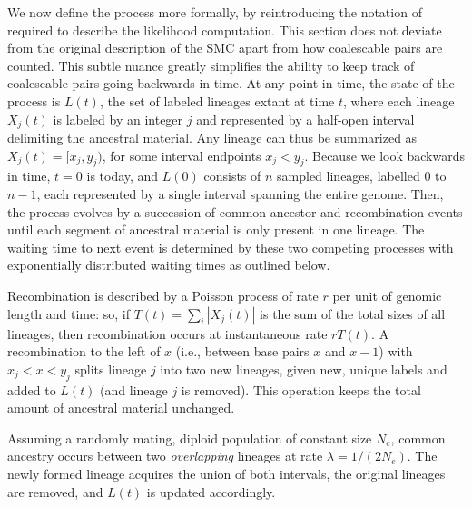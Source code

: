 \documentclass{article}
\begin{document}
We now define the process more formally, by reintroducing
the notation of \citet{mcvean_approximating_2005} required to describe
the likelihood computation. This section
does not deviate from the original description of the SMC apart from
how coalescable pairs are counted. This subtle nuance
greatly simplifies the ability to keep track of coalescable pairs going
backwards in time.
At any point in time, the state of the process is $L(t)$,
the set of labeled lineages extant at time $t$,
where each lineage $X_j(t)$ is labeled by an integer $j$
and represented by a half-open interval delimiting the
ancestral material. Any lineage can thus be summarized as $X_j(t) = [x_{j}, y_{j})$,
for some interval endpoints $x_{j} < y_{j}$.
Because we look backwards in time, $t=0$ is today, and 
$L(0)$ consists of $n$ sampled lineages, labelled $0$ to $n-1$,
each represented by a single interval spanning the entire genome.
Then, the process evolves by a succession of common ancestor and recombination
events until each segment of ancestral material is only present in one lineage.
The waiting time to next event is determined by these two competing processes
with exponentially distributed waiting times as outlined below.

Recombination is described by a Poisson process of rate $r$ per unit of genomic length and time:
so, if $T(t) = \sum_i |X_j(t)|$ is the sum of the total sizes of all lineages,
then recombination occurs at instantaneous rate $rT(t)$.
A recombination to the left of $x$
(i.e., between base pairs $x$ and $x-1$)
with $x_{j} < x <y_{j}$ splits lineage $j$ into two new lineages,
given new, unique labels and added to $L(t)$
(and lineage $j$ is removed).
This operation keeps the total amount of ancestral material unchanged.

Assuming a randomly mating, diploid population of constant size $N_e$,
common ancestry occurs between
two \emph{overlapping} lineages at rate $\lambda = 1/(2N_e)$.
The newly formed lineage acquires the union of both intervals,
the original lineages are removed, and $L(t)$ is updated accordingly.
\end{document}
